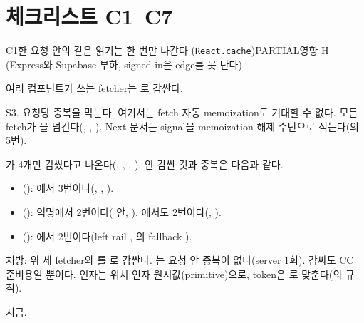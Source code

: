 \section{체크리스트 C1--C7}\label{sec:su-checklist}

\begin{checkitem}{\ckopen}{C1}{한 요청 안의 같은 읽기는 한 번만 나간다 (\texttt{React.cache})}{PARTIAL\ckdot{}영향 H (Express와 Supabase 부하, signed-in은 edge를 못 탄다)}
  \item[What] 여러 컴포넌트가 쓰는 fetcher는 로 감싼다.
  \item[Why] S3. 요청당 중복을 막는다. 여기서는 fetch 자동 memoization도 기대할 수 없다. 모든 fetch가 을 넘긴다(, , ). Next 문서는 signal을 memoization 해제 수단으로 적는다(의 5번).
  \item[How] 가 4개만 감쌌다고 나온다(, , , ). 안 감싼 것과 중복은 다음과 같다.
    \begin{itemize}[nosep]
      \item {}(): 에서 3번이다(, , ).
      \item {}():  익명에서 2번이다( 안, ). \code{/}에서도 2번이다(, ).
      \item {}(): \code{/}에서 2번이다(left rail , 의 fallback ).
    \end{itemize}
    처방: 위 세 fetcher와 를 로 감싼다. 는 요청 안 중복이 없다(server 1회). 감싸도 CC 준비용일 뿐이다. 인자는 위치 인자 원시값(primitive)으로, token은 로 맞춘다(의 규칙).
  \item[When] 지금.
\end{checkitem}

